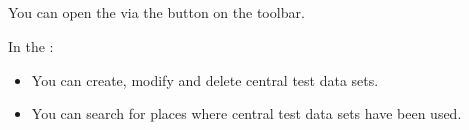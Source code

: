 \subsection{\gddataeditor{}}

You can open the \gddataeditor{} via the button on the toolbar. 

In the \gddataeditor{}:
\begin{itemize}
\item You can create, modify and delete central test data sets. 
\item You can search for places where central test data sets have been used. 
\end{itemize}


